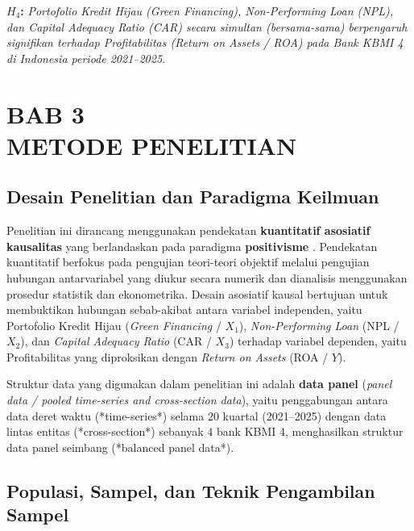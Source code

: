 \documentclass[12pt,a4paper]{article}
\numberwithin{equation}{section}
\begin{document}
\vspace{0.2cm}
\noindent \textbf{$H_4$:} \emph{Portofolio Kredit Hijau (Green Financing), Non-Performing Loan (NPL), dan Capital Adequacy Ratio (CAR) secara simultan (bersama-sama) berpengaruh signifikan terhadap Profitabilitas (Return on Assets / ROA) pada Bank KBMI 4 di Indonesia periode 2021--2025.}

\newpage
\setcounter{section}{0}
\section*{BAB 3\\[0.3cm]METODE PENELITIAN}
\setcounter{section}{3}
\setcounter{subsection}{0}
\setcounter{equation}{0}

\subsection{Desain Penelitian dan Paradigma Keilmuan}

\noindent
Penelitian ini dirancang menggunakan pendekatan \textbf{kuantitatif asosiatif kausalitas} yang berlandaskan pada paradigma \textbf{positivisme} \citep{Sugiyono2019}. Pendekatan kuantitatif berfokus pada pengujian teori-teori objektif melalui pengujian hubungan antarvariabel yang diukur secara numerik dan dianalisis menggunakan prosedur statistik dan ekonometrika. Desain asosiatif kausal bertujuan untuk membuktikan hubungan sebab-akibat antara variabel independen, yaitu Portofolio Kredit Hijau (\emph{Green Financing} / $X_1$), \emph{Non-Performing Loan} (NPL / $X_2$), dan \emph{Capital Adequacy Ratio} (CAR / $X_3$) terhadap variabel dependen, yaitu Profitabilitas yang diproksikan dengan \emph{Return on Assets} (ROA / $Y$).

\noindent
Struktur data yang digunakan dalam penelitian ini adalah \textbf{data panel} (\emph{panel data / pooled time-series and cross-section data}), yaitu penggabungan antara data deret waktu (*time-series*) selama 20 kuartal (2021--2025) dengan data lintas entitas (*cross-section*) sebanyak 4 bank KBMI 4, menghasilkan struktur data panel seimbang (*balanced panel data*).

\subsection{Populasi, Sampel, dan Teknik Pengambilan Sampel}
\end{document}
